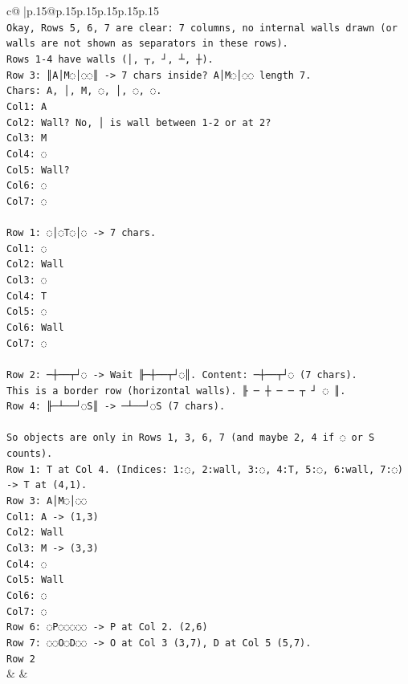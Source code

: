 \documentclass{article}
\begin{document}
{\begin{supertabular}{c@{$\;$}|p{.15\linewidth}@{}p{.15\linewidth}p{.15\linewidth}p{.15\linewidth}p{.15\linewidth}p{.15\linewidth}}
{{{\\ 
\texttt{Okay, Rows 5, 6, 7 are clear: 7 columns, no internal walls drawn (or walls are not shown as separators in these rows).} \\
\texttt{Rows 1{-}4 have walls (│, ┬, ┘, ┴, ┼).} \\
\texttt{Row 3: ║A│M◌│◌◌║ {-}> 7 chars inside? A│M◌│◌◌ length 7.} \\
\texttt{Chars: A, │, M, ◌, │, ◌, ◌.} \\
\texttt{Col1: A} \\
\texttt{Col2: Wall? No, │ is wall between 1{-}2 or at 2?} \\
\texttt{Col3: M} \\
\texttt{Col4: ◌} \\
\texttt{Col5: Wall?} \\
\texttt{Col6: ◌} \\
\texttt{Col7: ◌} \\
\\ 
\texttt{Row 1: ◌│◌T◌│◌ {-}> 7 chars.} \\
\texttt{Col1: ◌} \\
\texttt{Col2: Wall} \\
\texttt{Col3: ◌} \\
\texttt{Col4: T} \\
\texttt{Col5: ◌} \\
\texttt{Col6: Wall} \\
\texttt{Col7: ◌} \\
\\ 
\texttt{Row 2: ─┼──┬┘◌ {-}> Wait ╟─┼──┬┘◌║. Content: ─┼──┬┘◌ (7 chars).} \\
\texttt{This is a border row (horizontal walls). ╟ ─ ┼ ─ ─ ┬ ┘ ◌ ║.} \\
\texttt{Row 4: ╟─┴──┘◌S║ {-}> ─┴──┘◌S (7 chars).} \\
\\ 
\texttt{So objects are only in Rows 1, 3, 6, 7 (and maybe 2, 4 if ◌ or S counts).} \\
\texttt{Row 1: T at Col 4. (Indices: 1:◌, 2:wall, 3:◌, 4:T, 5:◌, 6:wall, 7:◌) {-}> T at (4,1).} \\
\texttt{Row 3: A│M◌│◌◌} \\
\texttt{Col1: A {-}> (1,3)} \\
\texttt{Col2: Wall} \\
\texttt{Col3: M {-}> (3,3)} \\
\texttt{Col4: ◌} \\
\texttt{Col5: Wall} \\
\texttt{Col6: ◌} \\
\texttt{Col7: ◌} \\
\texttt{Row 6: ◌P◌◌◌◌◌ {-}> P at Col 2. (2,6)} \\
\texttt{Row 7: ◌◌O◌D◌◌ {-}> O at Col 3 (3,7), D at Col 5 (5,7).} \\
\texttt{Row 2} \\
            }
        }
    }
    & & \\ \\


\end{supertabular}}
\end{document}
